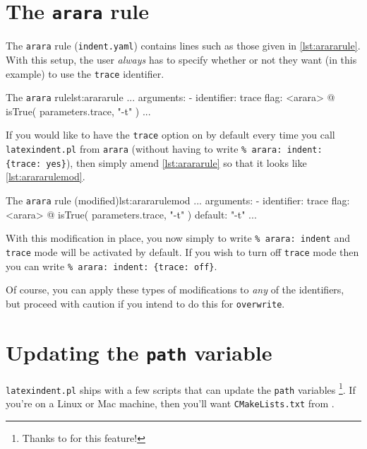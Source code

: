 	\section{The \texttt{arara} rule}
	 The \texttt{arara} rule (\texttt{indent.yaml}) contains lines such as those
	 given in \cref{lst:arararule}. With this setup, the user \emph{always} has
	 to specify whether or not they want (in this example) to use the \texttt{trace}
	 identifier.
	 \begin{yaml}[style=yaml-LST,numbers=none]{The \texttt{arara} rule}{lst:arararule}
...
arguments:
- identifier: trace
flag: <arara> @{ isTrue( parameters.trace, "-t" ) }
...
\end{yaml}

	 If you would like to have the \texttt{trace} option on by default every time you
	 call \texttt{latexindent.pl} from \texttt{arara} (without having to write \lstinline!% arara: indent: {trace: yes}!), then simply
	 amend \cref{lst:arararule} so that it looks like \cref{lst:arararulemod}.
	 \begin{yaml}[style=yaml-LST,numbers=none]{The \texttt{arara} rule (modified)}{lst:arararulemod}
...
arguments:
- identifier: trace
flag: <arara> @{ isTrue( parameters.trace, "-t" ) }
default: "-t"
...
\end{yaml}

	 With this modification in place, you now simply to write \lstinline!% arara: indent! and
	 \texttt{trace} mode will be activated by default. If you wish to turn off \texttt{trace}
	 mode then you can write \lstinline!% arara: indent: {trace: off}!.

	 Of course, you can apply these types of modifications to \emph{any} of the identifiers,
	 but proceed with caution if you intend to do this for \texttt{overwrite}.

	\section{Updating the \texttt{path} variable}\label{sec:updating-path}
	 \texttt{latexindent.pl} ships with a few scripts that can update the \texttt{path} variables
	 \footnote{Thanks to \cite{jasjuang} for this feature!}. If you're
	 on a Linux or Mac machine, then you'll want \texttt{CMakeLists.txt} from \cite{latexindent-home}.
